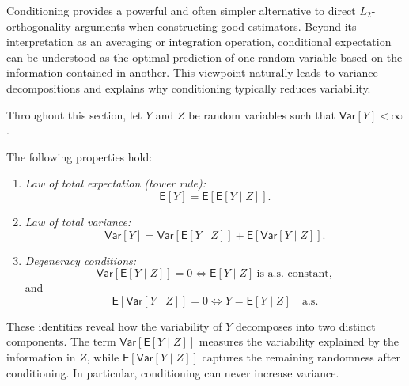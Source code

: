 Conditioning provides a powerful and often simpler alternative to direct
\(L_{2}\)-orthogonality arguments when constructing good estimators.
Beyond its interpretation as an averaging or integration operation,
conditional expectation can be understood as the optimal prediction of one
random variable based on the information contained in another.
This viewpoint naturally leads to variance decompositions and explains why
conditioning typically reduces variability.

Throughout this section, let \(Y\) and \(Z\) be random variables such that
\(\mathsf{Var}[Y] < \infty\).

\begin{lemma}
\label{lem:conditioning}
The following properties hold:
\begin{enumerate}[label=\roman*)]
    \item \emph{Law of total expectation (tower rule):}
    \[
        \mathsf{E}[Y] = \mathsf{E}[\mathsf{E}[Y \mid Z]].
    \]

    \item \emph{Law of total variance:}
    \[
        \mathsf{Var}[Y]
        =
        \mathsf{Var}[\mathsf{E}[Y \mid Z]]
        +
        \mathsf{E}[\mathsf{Var}[Y \mid Z]].
    \]
    \label{ite:conditioning2}

    \item \emph{Degeneracy conditions:}
    \[
        \mathsf{Var}[\mathsf{E}[Y \mid Z]] = 0
        \iff
        \mathsf{E}[Y \mid Z] \ \text{is a.s.\ constant},
    \]
    and
    \[
        \mathsf{E}[\mathsf{Var}[Y \mid Z]] = 0
        \iff
        Y = \mathsf{E}[Y \mid Z] \quad \text{a.s.}
    \]
    \label{ite:conditioning3}
\end{enumerate}
\end{lemma}

\medskip

These identities reveal how the variability of \(Y\) decomposes into two
distinct components.
The term \(\mathsf{Var}[\mathsf{E}[Y \mid Z]]\) measures the variability explained
by the information in \(Z\), while \(\mathsf{E}[\mathsf{Var}[Y \mid Z]]\) captures
the remaining randomness after conditioning.
In particular, conditioning can never increase variance.

